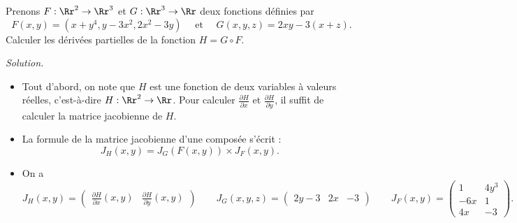 \documentclass[11pt, class=report,crop=false]{standalone}
\begin{document}
\begin{exemple}
Prenons $F : \Rr^2 \to \Rr^3$ et $G : \Rr^3 \to \Rr$ deux fonctions définies par
$$
F(x,y)=(x+y^4, y-3x^2,2x^2-3y) \quad \text{ et } \quad 
G(x,y,z) = 2xy-3(x+z).
$$
Calculer les dérivées partielles de la fonction  $H = G \circ F$. 

\bigskip
\emph{Solution.}

\begin{itemize}
  \item Tout d'abord, on note que $H$ est une fonction de deux variables à valeurs réelles, c'est-à-dire $H : \Rr^2 \to \Rr$. Pour calculer 
$\frac{\partial H}{\partial x}$ et $\frac{\partial H}{\partial y}$, il suffit de calculer la matrice jacobienne de $H$.

  \item La formule de la matrice jacobienne d'une composée s'écrit :
$$J_H (x,y) = J_G (F(x,y)) \times J_F (x,y).$$


  \item On a 
$$
J_H (x,y) = 
\begin{pmatrix}
\frac{\partial H}{\partial x}(x,y) &
\frac{\partial H}{\partial y}(x,y)
\end{pmatrix}
\qquad
J_G (x,y,z) = 
\begin{pmatrix}
2y-3  & 2x & -3
\end{pmatrix}
\qquad
J_F (x,y) = 
\begin{pmatrix}
1 & 4y^3\\
-6x & 1 \\
4x & -3 
\end{pmatrix}.
$$  



\end{itemize}
\end{exemple}
\end{document}
